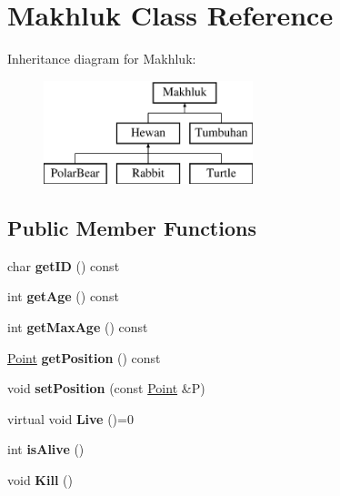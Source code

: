 \hypertarget{class_makhluk}{}\section{Makhluk Class Reference}
\label{class_makhluk}
Inheritance diagram for Makhluk\+:\begin{figure}[H]
\begin{center}
\leavevmode
\includegraphics[height=3.000000cm]{class_makhluk}
\end{center}
\end{figure}
\subsection*{Public Member Functions}
\begin{DoxyCompactItemize}
\item 
char {\bfseries get\+ID} () const \hypertarget{class_makhluk_ac1c4f42107c702ba928188fa2530c5f3}{}\label{class_makhluk_ac1c4f42107c702ba928188fa2530c5f3}

\item 
int {\bfseries get\+Age} () const \hypertarget{class_makhluk_aba388ab8fe2eafcda3495d16b7c9e4b7}{}\label{class_makhluk_aba388ab8fe2eafcda3495d16b7c9e4b7}

\item 
int {\bfseries get\+Max\+Age} () const \hypertarget{class_makhluk_ae002b2faad22dc950a3f42bd62ea54d9}{}\label{class_makhluk_ae002b2faad22dc950a3f42bd62ea54d9}

\item 
\hyperlink{class_point}{Point} {\bfseries get\+Position} () const \hypertarget{class_makhluk_a451445ffca2c8c3e45800b7096e65239}{}\label{class_makhluk_a451445ffca2c8c3e45800b7096e65239}

\item 
void {\bfseries set\+Position} (const \hyperlink{class_point}{Point} \&P)\hypertarget{class_makhluk_a7abec2f20a8c601ec6042682264a7f64}{}\label{class_makhluk_a7abec2f20a8c601ec6042682264a7f64}

\item 
virtual void {\bfseries Live} ()=0\hypertarget{class_makhluk_af0cc274cef5058743f6b048a78843bd1}{}\label{class_makhluk_af0cc274cef5058743f6b048a78843bd1}

\item 
int {\bfseries is\+Alive} ()\hypertarget{class_makhluk_a1677bd235210d490951fcd8a5653160d}{}\label{class_makhluk_a1677bd235210d490951fcd8a5653160d}

\item 
void {\bfseries Kill} ()\hypertarget{class_makhluk_a8031caebf761dbc200430c24726ca339}{}\label{class_makhluk_a8031caebf761dbc200430c24726ca339}

\end{DoxyCompactItemize}
